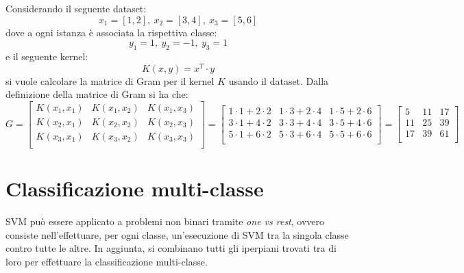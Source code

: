 \begin{esempio}
    Considerando il seguente dataset:
    \begin{equation}
        x_1 = [1, 2], \ x_2 = [3, 4], \ x_3 = [5, 6]
    \end{equation}
    dove a ogni istanza è associata la rispettiva classe:
    \begin{equation}
        y_1 = 1, \ y_2 = -1, \ y_3 = 1
    \end{equation}
    e il seguente kernel:
    \begin{equation}
        K(x, y) = x^T \cdot y
    \end{equation}
    si vuole calcolare la matrice di Gram per il kernel $K$ usando il dataset.
    Dalla definizione della matrice di Gram si ha che:
    \begin{equation}
        G = \left[
            \begin{array}{ccc}
                K(x_1, x_1) & K(x_1, x_2) & K(x_1, x_3) \\
                K(x_2, x_1) & K(x_2, x_2) & K(x_2, x_3) \\
                K(x_3, x_1) & K(x_3, x_2) & K(x_3, x_3) \\
            \end{array}
            \right] = \left[
            \begin{array}{ccc}
                1 \cdot 1 + 2 \cdot 2 & 1 \cdot 3 + 2 \cdot 4 & 1 \cdot 5 + 2 \cdot 6 \\
                3 \cdot 1 + 4 \cdot 2 & 3 \cdot 3 + 4 \cdot 4 & 3 \cdot 5 + 4 \cdot 6 \\
                5 \cdot 1 + 6 \cdot 2 & 5 \cdot 3 + 6 \cdot 4 & 5 \cdot 5 + 6 \cdot 6 \\
            \end{array}
            \right] = \left[
            \begin{array}{ccc}
                5  & 11 & 17 \\
                11 & 25 & 39 \\
                17 & 39 & 61 \\
            \end{array}
            \right]
    \end{equation}
\end{esempio}
\section{Classificazione multi-classe}
SVM può essere applicato a problemi non binari tramite \textit{one vs rest},
ovvero consiste nell'effettuare, per ogni classe, un'esecuzione di SVM tra la singola classe
contro tutte le altre. In aggiunta, si combinano tutti gli iperpiani trovati
tra di loro per effettuare la classificazione multi-classe.


